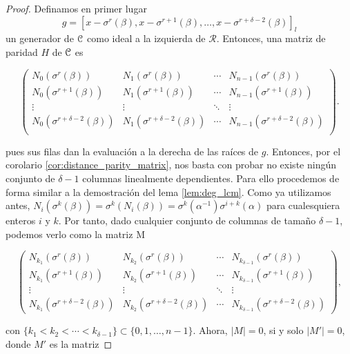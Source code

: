 \begin{proof}
Definamos en primer lugar
\[
g = {[x - \sigma^r(\beta), x - \sigma^{r+1}(\beta), \dots, x - \sigma^{r+\delta -2}(\beta)]}_l
\]
un generador de \(\mathcal{C}\) como ideal a la izquierda de \(\mathcal{R}\). Entonces, una matriz de paridad \(H\) de \(\mathcal{C}\) es

\[
\begin{pmatrix}
    N_0(\sigma^r(\beta)) & N_1(\sigma^r(\beta)) & \cdots & N_{n-1}(\sigma^r(\beta)) \\
    N_0(\sigma^{r+1}(\beta)) & N_1(\sigma^{r+1}(\beta)) & \cdots & N_{n-1}(\sigma^{r+1}(\beta)) \\
    \vdots & \vdots & \ddots & \vdots \\
    N_0(\sigma^{r+\delta-2}(\beta)) & N_1(\sigma^{r+\delta-2}(\beta)) & \cdots & N_{n-1}(\sigma^{r+\delta-2}(\beta)) \\
\end{pmatrix}
.\]

pues sus filas dan la evaluación a la derecha de las raíces de \(g\). Entonces, por el corolario \ref{cor:distance_parity_matrix}, nos basta con probar no existe ningún conjunto de \(\delta -1\) columnas linealmente dependientes. Para ello procedemos de forma similar a la demostración del lema \ref{lem:deg_lcm}. Como ya utilizamos antes, \(N_i(\sigma^k(\beta)) = \sigma^k(N_i(\beta)) = \sigma^k(\alpha^{-1})\sigma^{i+k}(\alpha)\) para cualesquiera enteros \(i\) y \(k\). Por tanto, dado cualquier conjunto de columnas de tamaño \(\delta -1\), podemos verlo como la matriz M

\[
\begin{pmatrix}
    N_{k_1}(\sigma^r(\beta)) & N_{k_2}(\sigma^r(\beta)) & \cdots & N_{k_{\delta-1}}(\sigma^r(\beta)) \\
    N_{k_1}(\sigma^{r+1}(\beta)) & N_{k_2}(\sigma^{r+1}(\beta)) & \cdots & N_{k_{\delta-1}}(\sigma^{r+1}(\beta)) \\
    \vdots & \vdots & \ddots & \vdots \\
    N_{k_1}(\sigma^{r+\delta-2}(\beta)) & N_{k_2}(\sigma^{r+\delta-2}(\beta)) & \cdots & N_{k_{\delta-1}}(\sigma^{r+\delta-2}(\beta))
\end{pmatrix}
,\]

con \(\{k_1 < k_2 < \cdots < k_{\delta-1}\} \subset \{0, 1, \dots, n-1\}\). Ahora, \(|M| = 0\), si y solo \(|M'| =0\), donde \(M'\) es la matriz


\end{proof}
